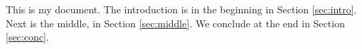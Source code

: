 This is my document.
The introduction is in the beginning in Section \ref{sec:intro}.
Next is the middle, in Section \ref{sec:middle}.
We conclude at the end in Section \ref{sec:conc}.